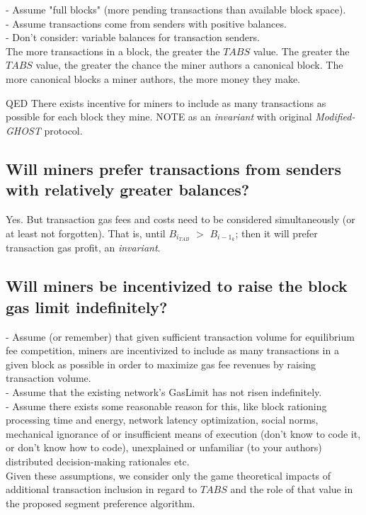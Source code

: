 \documentclass[11pt]{article}
\theoremstyle{plain}
\newcommand{\mghost}{\textit{Modified-GHOST }}
\begin{document}
- Assume "full blocks" (more pending transactions than available block space).
\\
- Assume transactions come from senders with positive balances. \\
- Don't consider: variable balances for transaction senders. \\

The more transactions in a block, the greater the $TABS$ value.
The greater the $TABS$ value, the greater the chance the miner authors a
canonical block.
The more canonical blocks a miner authors, the more money they make.

QED There exists incentive for miners to include as many transactions as
possible for each block they mine.
NOTE as an \textit{invariant} with original \mghost protocol.

\subsection{\small{Will miners prefer transactions from senders with relatively
greater balances?}}

Yes. But transaction gas fees and costs need to be considered simultaneously
(or at least not forgotten).
That is, until $B_{i}_{TAB}$ $>$ $B_{i-1}_{k}$; then it will prefer transaction
gas profit, an \textit{invariant}.

\subsection{\small{Will miners be incentivized to raise the block gas limit
indefinitely?}}

- Assume (or remember) that given sufficient transaction volume for equilibrium
fee competition, miners
  are incentivized to include as many transactions in a given block as possible
in order to maximize
  gas fee revenues by raising transaction volume. \\
- Assume that the existing network's GasLimit has not risen indefinitely. \\
- Assume there exists some reasonable reason for this, like block rationing
processing time and energy,
  network latency optimization, social norms, mechanical ignorance of or
insufficient means of execution (don't know to code it, or don't know how to
code),
  unexplained or unfamiliar (to your authors) distributed decision-making
rationales etc. \\

Given these assumptions, we consider only the game theoretical impacts of
additional transaction inclusion
in regard to $TABS$ and the role of that value in the proposed segment
preference algorithm.
\end{document}
